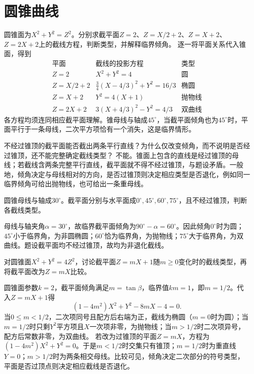 \par\addvspace{12pt}

\section{圆锥曲线}

圆锥面为\(X^2+Y^2=Z^2\)。分别求截平面\(Z=2\)、\(Z=X/2+2\)、\(Z=X+2\)、\(Z=2X+2\)上的截线方程，判断类型，并解释临界倾角。
\solutionanswer
逐一将平面关系代入锥面，得到
\[
\begin{array}{c|c|c}
\text{平面}&\text{截线的投影方程}&\text{类型}\\\hline
Z=2&X^2+Y^2=4&\text{圆}\\
Z=X/2+2&\frac34(X-4/3)^2+Y^2=16/3&\text{椭圆}\\
Z=X+2&Y^2=4(X+1)&\text{抛物线}\\
Z=2X+2&3(X+4/3)^2-Y^2=4/3&\text{双曲线}
\end{array}
\]
各方程均须连同相应截平面理解。锥母线与轴成\(45^\circ\)，当截平面倾角也为\(45^\circ\)时，平面平行于一条母线，二次平方项恰有一个消失，这是临界情形。


不经过锥顶的截平面能否截出两条平行直线？为什么仅改变倾角，而不说明是否经过锥顶，还不能完整确定截线类型？
\solutionanswer
不能。锥面上包含的直线是经过锥顶的母线；若截线含两条完整平行直线，截平面就不得不经过锥顶，与题设矛盾。一般地，倾角决定与母线相对的方向，是否过锥顶则决定相应类型是否退化，例如同一临界倾角可给出抛物线，也可给出一条重母线。


圆锥母线与轴成\(30^\circ\)。截平面分别与水平面成\(0^\circ,45^\circ,60^\circ,75^\circ\)，且不经过锥顶，判断各截线类型。
\par
\solutionanswer
母线与轴夹角\(\alpha=30^\circ\)，故临界截平面倾角为\(90^\circ-\alpha=60^\circ\)。因此倾角\(0^\circ\)时为圆；\(45^\circ\)小于临界角，为非圆椭圆；\(60^\circ\)恰为临界角，为抛物线；\(75^\circ\)大于临界角，为双曲线。题设截平面均不经过锥顶，故均为非退化截线。


对圆锥面\(X^2+Y^2=4Z^2\)，讨论截平面\(Z=mX+1\)随\(m\ge0\)变化时的截线类型，再将截平面改为\(Z=mX\)比较。
\par
\solutionanswer
圆锥面参数\(k=2\)，截平面倾角满足\(m=\tan\beta\)，临界值\(km=1\)，即\(m=1/2\)。代入\(Z=mX+1\)得
\[(1-4m^2)X^2+Y^2-8mX-4=0.\]
当\(0\le m<1/2\)，二次项同号且配方后右端为正，截线为椭圆（\(m=0\)时为圆）；当\(m=1/2\)时只剩\(Y^2\)平方项且\(X\)一次项非零，为抛物线；当\(m>1/2\)时二次项异号，配方后常数非零，为双曲线。
若改为过锥顶的平面\(Z=mX\)，方程为\((1-4m^2)X^2+Y^2=0\)。于是\(m<1/2\)时交集只有锥顶；\(m=1/2\)时为重直线\(Y=0\)；\(m>1/2\)时为两条相交母线。比较可见，倾角决定二次部分的符号类型，平面是否过顶点则决定相应截线是否退化。


